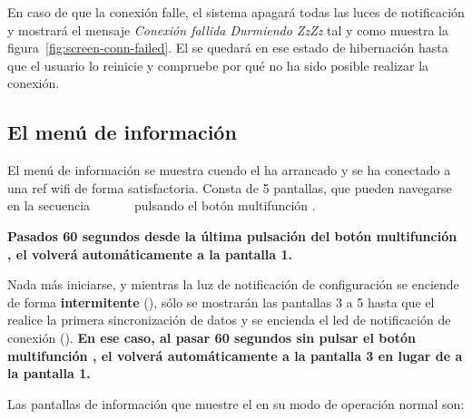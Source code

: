 En caso de que la conexión falle, el sistema apagará todas las luces de notificación y mostrará el mensaje \emph{Conexión fallida Durmiendo ZzZz} tal y como muestra la figura~\ref{fig:screen-conn-failed}. El \MI se quedará en ese estado de hibernación hasta que el usuario lo reinicie y compruebe por qué no ha sido posible realizar la conexión.



\subsection{El menú de información}

El menú de información se muestra cuendo el \MIE ha arrancado y se ha conectado a una ref wifi de forma satisfactoria. Consta de 5 pantallas, que pueden navegarse en la secuencia
~~~
~~
pulsando el botón multifunción .

\textbf{Pasados 60 segundos desde la última pulsación del botón multifunción , el \MI volverá automáticamente a la pantalla 1.}

Nada más iniciarse, y mientras la luz de notificación de configuración  se enciende de forma \textbf{intermitente} (), sólo se mostrarán las pantallas 3 a 5 hasta que el \ME realice la primera sincronización de datos y se encienda el led de notificación de conexión  (). \textbf{En ese caso, al pasar 60 segundos sin pulsar el botón multifunción , el \MI volverá automáticamente a la pantalla 3 en lugar de a la pantalla 1.}
\attend

Las pantallas de información que muestre el \MIE en su modo de operación normal son:

